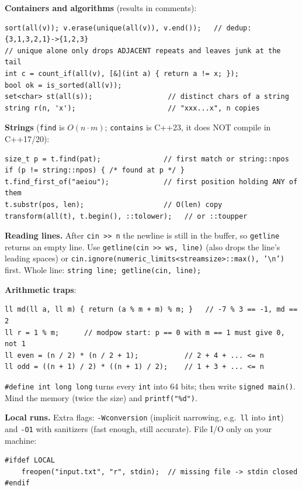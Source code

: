 {\scriptsize
\setlength{\parskip}{2pt}
\textbf{Containers and algorithms} (results in comments):
\begin{lstlisting}[style=cpp]
sort(all(v)); v.erase(unique(all(v)), v.end());   // dedup: {3,1,3,2,1}->{1,2,3}
// unique alone only drops ADJACENT repeats and leaves junk at the tail
int c = count_if(all(v), [&](int a) { return a != x; });
bool ok = is_sorted(all(v));
set<char> st(all(s));                  // distinct chars of a string
string r(n, 'x');                      // "xxx...x", n copies
\end{lstlisting}

\textbf{Strings} (\texttt{find} is $O(n \cdot m)$; \texttt{contains} is C++23,
it does NOT compile in C++17/20):
\begin{lstlisting}[style=cpp]
size_t p = t.find(pat);               // first match or string::npos
if (p != string::npos) { /* found at p */ }
t.find_first_of("aeiou");             // first position holding ANY of them
t.substr(pos, len);                   // O(len) copy
transform(all(t), t.begin(), ::tolower);   // or ::toupper
\end{lstlisting}

\textbf{Reading lines.} After \texttt{cin >> n} the newline is still in the
buffer, so \texttt{getline} returns an empty line. Use
\texttt{getline(cin >> ws, line)} (also drops the line's leading spaces) or
\texttt{cin.ignore(numeric\_limits<streamsize>::max(), '\textbackslash n')}
first. Whole line: \texttt{string line; getline(cin, line);}

\textbf{Arithmetic traps}:
\begin{lstlisting}[style=cpp]
ll md(ll a, ll m) { return (a % m + m) % m; }   // -7 % 3 == -1, md == 2
ll r = 1 % m;      // modpow start: p == 0 with m == 1 must give 0, not 1
ll even = (n / 2) * (n / 2 + 1);           // 2 + 4 + ... <= n
ll odd = ((n + 1) / 2) * ((n + 1) / 2);    // 1 + 3 + ... <= n
\end{lstlisting}
\texttt{\#define int long long} turns every \texttt{int} into 64 bits; then
write \texttt{signed main()}. Mind the memory (twice the size) and
\texttt{printf("\%d")}.

\textbf{Local runs.} Extra flags: \texttt{-Wconversion} (implicit narrowing,
e.g.\ \texttt{ll} into \texttt{int}) and \texttt{-O1} with sanitizers (fast
enough, still accurate). File I/O only on your machine:
\begin{lstlisting}[style=cpp]
#ifdef LOCAL
    freopen("input.txt", "r", stdin);  // missing file -> stdin closed
#endif
\end{lstlisting}
}
